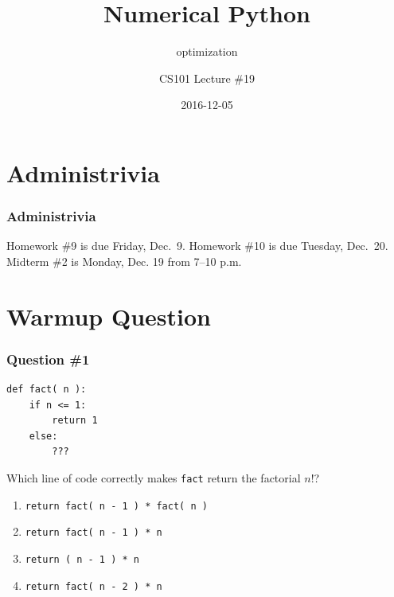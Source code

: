 \documentclass[11pt]{beamer}
\title{Numerical Python}
\subtitle{optimization}
\author{CS101 Lecture \#19}
\date{2016-12-05}
\begin{document}
  \setcounter{showProgressBar}{0}
  \setcounter{showSlideNumbers}{0}

\frame{\titlepage}

\setcounter{framenumber}{0}
\setcounter{showProgressBar}{1}
\setcounter{showSlideNumbers}{1}

\section{Administrivia}

\begin{frame}
  \frametitle{Administrivia}
  \Enlarge

  \begin{itemize}
  \myitem  Homework \#9 is due Friday, Dec.\ 9.
  \myitem  Homework \#10 is due Tuesday, Dec.\ 20.
  \myitem  Midterm \#2 is Monday, Dec. 19 from 7–10 p.m.
  \end{itemize}
\end{frame}

\section{Warmup Question}

\begin{frame}[fragile]
  \frametitle{Question \#1}

  \begin{Verbatim}
def fact( n ):
    if n <= 1:
        return 1
    else:
        ???
  \end{Verbatim}

Which line of code correctly makes \texttt{fact} return the factorial $n!$?

  \begin{enumerate}[label=\Alph*]
    \item  \texttt{return fact( n - 1 ) * fact( n )}
    \item  \texttt{return fact( n - 1 ) * n}
    \item  \texttt{return ( n - 1 ) * n}
    \item  \texttt{return fact( n - 2 ) * n}
  \end{enumerate}
\end{frame}
\end{document}
